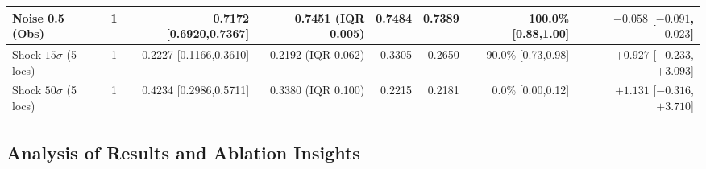 \documentclass[aip,cha,reprint,amsmath,amssymb]{revtex4-2}
\begin{document}
\begin{table}[t]
\begin{ruledtabular}
\begin{tabular}{lcrrrrrr}
Noise 0.5 (Obs) & 1 & \textbf{0.7172} [0.6920,0.7367] & 0.7451 (IQR 0.005) & 0.7484 & 0.7389 & \textbf{100.0\%} [0.88,1.00] & $-0.058$ [$-0.091$,$-0.023$] \\
\midrule
Shock $15\sigma$ (5 locs) & 1 & 0.2227 [0.1166,0.3610] & 0.2192 (IQR 0.062) & 0.3305 & 0.2650 & 90.0\% [0.73,0.98] & $+0.927$ [$-0.233$,$+3.093$] \\
Shock $50\sigma$ (5 locs) & 1 & 0.4234 [0.2986,0.5711] & 0.3380 (IQR 0.100) & 0.2215 & 0.2181 & 0.0\% [0.00,0.12] & $+1.131$ [$-0.316$,$+3.710$] \\
\end{tabular}
\end{ruledtabular}
\end{table}

\subsection{Analysis of Results and Ablation Insights}
\end{document}
